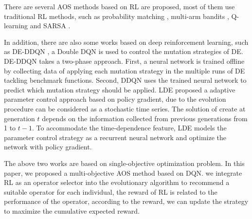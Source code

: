 \documentclass[journal]{IEEEtran}
\begin{document}
There are several AOS methods based on RL are proposed, most of them use traditional RL methods, such as probability matching \cite{fialho2010toward,sharma2018performance}, multi-arm bandits \cite{dacosta2008adaptive}, Q-learning \cite{pettinger2002controlling} and SARSA \cite{sakurai2010method}.

In addition, there are also some works based on deep reinforcement learning,
such as DE-DDQN \cite{sharma2019deep}, a Double DQN is used to control the mutation strategies of DE. DE-DDQN takes a two-phase approach. First, a neural network is trained offline by collecting data of applying each mutation strategy in the multiple runs of DE tackling benchmark functions.
Second, DDQN uses the trained neural network to predict which mutation strategy should be applied.
LDE \cite{sun2021learning} proposed a adaptive parameter control approach based on policy gradient, due to the evolution procedure can be considered as a stochastic time series. The solution of create at generation $t$ depends on the information collected from previous generations from 1 to $t-1$. To accommodate the time-dependence feature, LDE models the parameter control strategy as a recurrent neural network and optimize the network with policy gradient.

The above two works are based on single-objective optimization problem. In this paper, we proposed a multi-objective AOS method based on DQN.
we integrate RL as an operator selector into the evolutionary algorithm to recommend a suitable operator for each individual, the reward of RL is related to the performance of the operator, according to the reward, we can update the strategy to maximize the cumulative expected reward.

\end{document}
